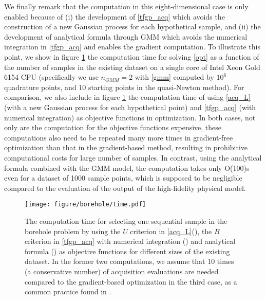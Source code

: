\documentclass[11pt]{article}
\begin{document}
We finally remark that the computation in this eight-dimensional case is only enabled because of (i) the development of \eqref{tfgp_acq} which avoids the construction of a new Gaussian process for each hypothetical sample, and (ii) the development of analytical formula through GMM which avoids the numerical integration in \eqref{tfgp_acq} and enables the gradient computation. To illustrate this point, we show in figure \ref{fig:time} the computation time for solving \eqref{opt} as a function of the number of samples in the existing dataset on a single core of Intel Xeon Gold 6154 CPU (specifically we use $n_{GMM}=2$ with \eqref{gmm} computed by $10^6$ quadrature points, and 10 starting points in the quasi-Newton method). For comparison, we also include in figure \ref{fig:time} the computation time of using \eqref{acq_L} (with a new Gaussian process for each hypothetical point) and \eqref{tfgp_acq} (with numerical integration) as objective functions in optimization. In both cases, not only are the computation for the objective functions expensive, these computations also need to be repeated many more times in gradient-free optimization than that in the gradient-based method, resulting in prohibitive computational costs for large number of samples. In contrast, using the analytical formula combined with the GMM model, the computation takes only O(100)s even for a dataset of 1000 sample points, which is supposed to be negligible compared to the evaluation of the output of the high-fidelity physical model. 




\begin{figure}
    \centering
    \texttt{[image: figure/borehole/time.pdf]}
    \caption{The computation time for selecting one sequential sample in the borehole problem by using the $U$ criterion in \eqref{acq_L}(\greenline), the $B$ criterion in \eqref{tfgp_acq} with numerical integration (\orangeline) and analytical formula (\blueline) as objective functions for different sizes of the existing dataset. In the former two computations, we assume that 10 times (a conservative number) of acquisition evaluations are needed compared to the gradient-based optimization in the third case, as a common practice found in \cite{martins2021engineering}.}
    \label{fig:time}
\end{figure}

                                                                
\end{document}

